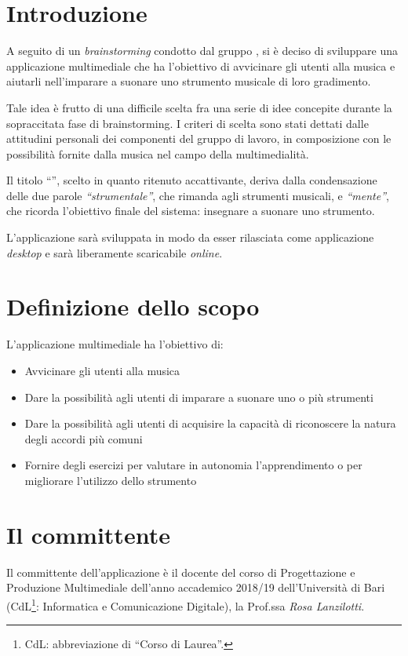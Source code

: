 \section{Introduzione}
A seguito di un \textit{brainstorming} condotto dal gruppo \theteam{}, si è deciso di sviluppare una applicazione multimediale che ha l'obiettivo di avvicinare gli utenti alla musica e aiutarli nell'imparare a suonare uno strumento musicale di loro gradimento.

Tale idea è frutto di una difficile scelta fra una serie di idee concepite durante la sopraccitata fase di brainstorming. I criteri di scelta sono stati dettati dalle attitudini personali dei componenti del gruppo di lavoro, in composizione con le possibilità fornite dalla musica nel campo della multimedialità.

Il titolo ``\ProjectTitle{}'', scelto in quanto ritenuto accattivante, deriva dalla condensazione delle due parole \emph{``strumentale''}, che rimanda agli strumenti musicali, e \emph{``mente''}, che ricorda l'obiettivo finale del sistema: insegnare a suonare uno strumento.

L'applicazione sarà sviluppata in modo da esser rilasciata come applicazione \textit{desktop} e sarà liberamente scaricabile \textit{online}.

\section{Definizione dello scopo}
L'applicazione multimediale \ProjectTitle{} ha l'obiettivo di:
\begin{itemize}
	\item Avvicinare gli utenti alla musica
	\item Dare la possibilità agli utenti di imparare a suonare uno o più strumenti
	\item Dare la possibilità agli utenti di acquisire la capacità di riconoscere la natura degli accordi più comuni
	\item Fornire degli esercizi per valutare in autonomia l'apprendimento o per migliorare l'utilizzo dello strumento
\end{itemize}

\section{Il committente}
Il committente dell'applicazione è il docente del corso di Progettazione e Produzione Multimediale dell'anno accademico 2018/19 dell'Università di Bari (CdL\footnote{CdL: abbreviazione di ``Corso di Laurea''.}: Informatica e Comunicazione Digitale), la Prof.ssa \emph{Rosa Lanzilotti}.

